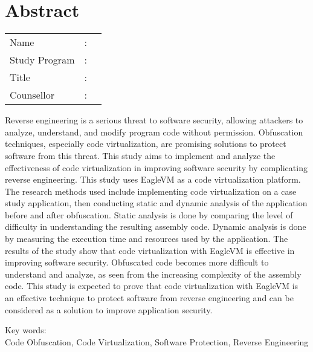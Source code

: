 %
%
%

\chapter*{Abstract}

\vspace*{0.2cm}
{
	\setlength{\parindent}{0pt}

	\begin{tabular}{@{}l l p{10cm}}
		Name          & : & \penulis      \\
		Study Program & : & \program      \\
		Title         & : & \judulInggris \\
		Counsellor    & : & \pembimbing   \\
	\end{tabular}

	\bigskip
	\bigskip

Reverse engineering is a serious threat to software security, allowing attackers to analyze, understand, and modify program code without permission. Obfuscation techniques, especially code virtualization, are promising solutions to protect software from this threat. This study aims to implement and analyze the effectiveness of code virtualization in improving software security by complicating reverse engineering. This study uses EagleVM as a code virtualization platform. The research methods used include implementing code virtualization on a case study application, then conducting static and dynamic analysis of the application before and after obfuscation. Static analysis is done by comparing the level of difficulty in understanding the resulting assembly code. Dynamic analysis is done by measuring the execution time and resources used by the application. The results of the study show that code virtualization with EagleVM is effective in improving software security. Obfuscated code becomes more difficult to understand and analyze, as seen from the increasing complexity of the assembly code. This study is expected to prove that code virtualization with EagleVM is an effective technique to protect software from reverse engineering and can be considered as a solution to improve application security.

	\bigskip

	Key words:\\
	Code Obfuscation, Code Virtualization, Software Protection, Reverse Engineering
}

\newpage
